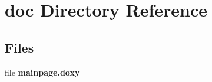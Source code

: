 \section{doc Directory Reference}
\label{dir_e68e8157741866f444e17edd764ebbae}
\subsection*{Files}
\begin{DoxyCompactItemize}
\item 
file {\bfseries mainpage.\-doxy}
\end{DoxyCompactItemize}

